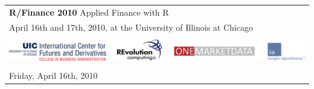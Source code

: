 \documentclass[11pt]{article}
\newcommand{\ra}[1]{\renewcommand{\arraystretch}{#1}}  %
\begin{document}
\thispagestyle{empty}


\ra{1.2} \sf

\begin{tabular}{rlrlp{5in}} %

  \multicolumn{5}{l}{\Huge \textbf{\color{KeynoteTalk} R/Finance 2010} \huge \phantom{i} Applied Finance with R} \\
  \multicolumn{5}{l}{\large \color{Breaks} April 16th and 17th, 2010, at the University of Illinois at Chicago} \\[3pt]

  \bottomrule \\

  \multicolumn{5}{l}{
    \centering
    \includegraphics[page=1,scale=0.15]{alllogos}
  } \\[5pt]

  \bottomrule \\[3pt]

  \multicolumn{5}{l}{\Large Friday, April 16th, 2010} \\


\end{tabular}
\end{document}
